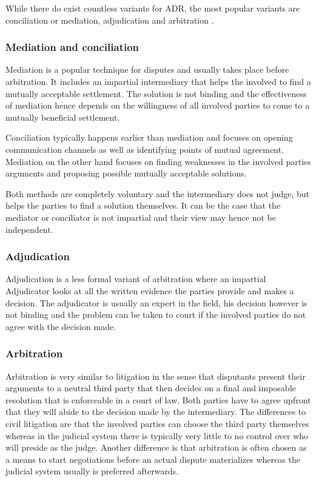 \documentclass[12pt,msc,a4paper,oneside]{ucl_thesis}
\begin{document}
While there do exist countless variants for ADR, the most popular variants are conciliation or mediation, adjudication and arbitration \cite{using_adr:citizensadvice}.

\subsubsection{Mediation and conciliation}
Mediation is a popular technique for disputes and usually takes place before arbitration. It includes an impartial intermediary that helps the involved to find a mutually acceptable settlement. The solution is not binding and the effectiveness of mediation hence depends on the willingness of all involved parties to come to a mutually beneficial settlement.

Conciliation typically happens earlier than mediation and focuses on opening communication channels as well as identifying points of mutual agreement. Mediation on the other hand focuses on finding weaknesses in the involved parties arguments and proposing possible mutually acceptable solutions.

Both methods are completely voluntary and the intermediary does not judge, but helps the parties to find a solution themselves. It can be the case that the mediator or conciliator is not impartial and their view may hence not be independent. \cite{using_adr:citizensadvice}

\subsubsection{Adjudication}
Adjudication is a less formal variant of arbitration where an impartial Adjudicator looks at all the written evidence the parties provide and makes a decision. The adjudicator is usually an expert in the field, his decision however is not binding and the problem can be taken to court if the involved parties do not agree with the decision made. \cite{using_adr:citizensadvice}

\subsubsection{Arbitration}
Arbitration is very similar to litigation in the sense that disputants present their arguments to a neutral third party that then decides on a final and imposable resolution that is enforceable in a court of law. Both parties have to agree upfront that they will abide to the decision made by the intermediary.
The differences to civil litigation are that the involved parties can choose the third party themselves whereas in the judicial system there is typically very little to no control over who will preside as the judge. Another difference is that arbitration is often chosen as a means to start negotiations before an actual dispute materializes whereas the judicial system usually is preferred afterwards. \cite{adr_overview:findlaw}
\end{document}
